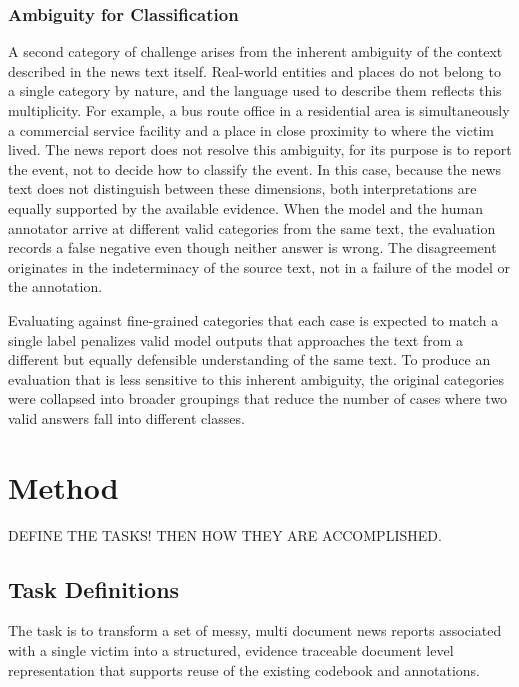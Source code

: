 \documentclass{article}
\begin{document}
\subsubsection{Ambiguity for
Classification}\label{ambiguity-for-classification}

A second category of challenge arises from the inherent ambiguity of the
context described in the news text itself. Real-world entities and
places do not belong to a single category by nature, and the language
used to describe them reflects this multiplicity. For example, a bus
route office in a residential area is simultaneously a commercial
service facility and a place in close proximity to where the victim
lived. The news report does not resolve this ambiguity, for its purpose
is to report the event, not to decide how to classify the event. In this
case, because the news text does not distinguish between these
dimensions, both interpretations are equally supported by the available
evidence. When the model and the human annotator arrive at different
valid categories from the same text, the evaluation records a false
negative even though neither answer is wrong. The disagreement
originates in the indeterminacy of the source text, not in a failure of
the model or the annotation.

Evaluating against fine-grained categories that each case is expected to
match a single label penalizes valid model outputs that approaches the
text from a different but equally defensible understanding of the same
text. To produce an evaluation that is less sensitive to this inherent
ambiguity, the original categories were collapsed into broader groupings
that reduce the number of cases where two valid answers fall into
different classes.

\section{Method}\label{method}

DEFINE THE TASKS!  THEN HOW THEY ARE ACCOMPLISHED.

\subsection{Task Definitions}\label{task-definitions}

The task is to transform a set of messy, multi document
news reports associated with a single victim into a structured, evidence
traceable document level representation that supports reuse of the
existing codebook and annotations.
\end{document}
